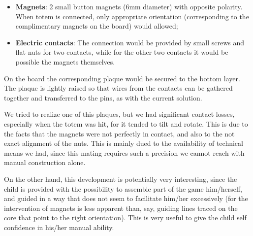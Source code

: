 \documentclass[a4paper,twoside]{book}
\begin{document}
\begin{itemize}
\item \textbf{Magnets}: 2 small button magnets (6mm diameter) with opposite polarity. When totem is connected, only appropriate orientation (corresponding to the complimentary magnets on the board) would allowed;
\item \textbf{Electric contacts}: The connection would be provided by small screws and flat nuts for two contacts, while for the other two contacts it would be possible the magnets themselves.
\end{itemize}
On the board the corresponding plaque would be secured to the bottom layer. The plaque is lightly raised so that wires from the contacts can be gathered together and transferred to the pins, as with the current solution.

We tried to realize one of this plaques, but we had significant contact losses, especially when the totem was hit, for it tended to tilt and rotate. This is due to the facts that the magnets were not perfectly in contact, and also to the not exact alignment of the nuts. This is mainly dued to the availability of technical means we had, since this mating requires such a precision we cannot reach with manual construction alone.

On the other hand, this development is potentially very interesting, since the child is provided with the possibility to assemble part of the game him/herself, and guided in a way that does not seem to facilitate him/her excessively (for the intervention of magnets is less apparent than, say, guiding lines traced on the core that point to the right orientation). This is very useful to give the child self confidence in his/her manual ability.
\end{document}
